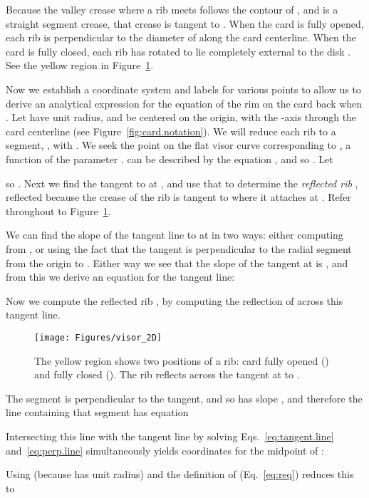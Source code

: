 \pdfoutput=1  \documentclass[]{article}
\newcommand{\figlab}[1]{\label{fig:#1}}
\newcommand{\eqnref}[1]{\ref{eq:#1}}
\newcommand{\figref}[1]{\ref{fig:#1}}
\begin{document}
Because the valley crease where a rib meets  follows the contour of , and is a straight segment crease,
that crease is tangent to . 
When the card is fully opened, each rib is perpendicular to the diameter of  along the card centerline.
When the card is fully closed, each rib has rotated to lie completely external to the disk .
See the yellow region in Figure~\figref{visor.2D}.

Now we establish a coordinate system and labels for various points to allow us to
derive an analytical expression for the equation of the rim on the card back when .
Let  have unit radius, and be centered on the origin, with the -axis through
the card centerline (see Figure~\figref{card.notation}).  We will reduce each rib  to a segment, , with
.
We seek the point on the flat visor curve corresponding to , a function of the parameter .
 can be described by the equation , and so
. 
Let 

so .
Next we find the tangent to  at , and use that to determine the \emph{reflected rib} ,
reflected because the crease of the rib  is tangent to  where it attaches at .
Refer throughout to Figure~\figref{visor.2D}.



We can find the slope of the tangent line to 
at  in two ways: either computing  from ,
or using the fact that the tangent is perpendicular to the radial segment from
the origin to .  Either way we see that the slope of the tangent at 
is , and from this we derive an equation for the tangent line:

Now we compute the reflected rib , by computing the reflection  of  across this tangent line.

\begin{figure}[htbp]
\centering
\texttt{[image: Figures/visor\_2D]}
\caption{The yellow region shows two positions of a rib: 
card fully opened () and fully closed ().
The rib  reflects across the tangent at  to .
}
\figlab{visor.2D}
\end{figure}


The segment  is perpendicular to the tangent, and so has slope ,
and therefore the line containing that segment has equation

Intersecting this line with the tangent line by solving
Eqs.~\eqnref{tangent.line} and~\eqnref{perp.line} simultaneously
yields coordinates for the midpoint  of :

Using  (because  has unit radius)
and the definition of  (Eq.~\eqnref{req}) reduces this to
\end{document}
